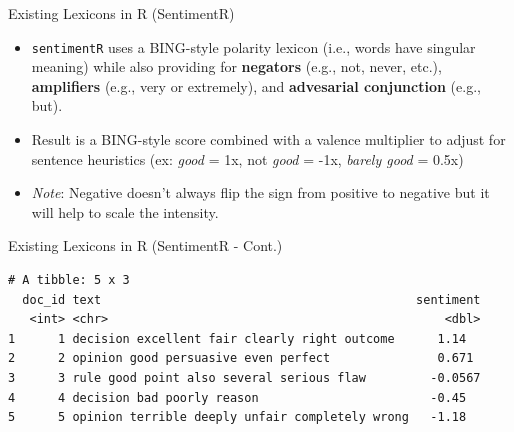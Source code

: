 \documentclass[
  ignorenonframetext,
  aspectratio=169]{beamer}
\newenvironment{Shaded}{\begin{snugshade}}{\end{snugshade}}
\newcommand{\AttributeTok}[1]{\textcolor[rgb]{0.13,0.29,0.53}{#1}}
\newcommand{\CommentTok}[1]{\textcolor[rgb]{0.56,0.35,0.01}{\textit{#1}}}
\newcommand{\FunctionTok}[1]{\textcolor[rgb]{0.13,0.29,0.53}{\textbf{#1}}}
\newcommand{\NormalTok}[1]{#1}
\newcommand{\SpecialCharTok}[1]{\textcolor[rgb]{0.81,0.36,0.00}{\textbf{#1}}}
\begin{document}
\begin{frame}{Existing Lexicons in R (SentimentR)}
\label{existing-lexicons-in-r-sentimentr}
\begin{itemize}
\item \texttt{sentimentR} uses a BING-style polarity lexicon (i.e., words have singular meaning) while also providing for \textbf{negators} (e.g., not, never, etc.), \textbf{amplifiers} (e.g., very or extremely), and \textbf{advesarial conjunction} (e.g., but). 
\item Result is a BING-style score combined with a valence multiplier to adjust for sentence heuristics (ex: \textit{good} = 1x, not \textit{good} = -1x, \textit{barely good} = 0.5x)
\item \textit{Note}: Negative doesn't always flip the sign from positive to negative but it will help to scale the intensity. 
\end{itemize}
\end{frame}

\begin{frame}[fragile]{Existing Lexicons in R (SentimentR - Cont.)}
\label{existing-lexicons-in-r-sentimentr---cont.}
\scriptsize

\begin{Shaded}
\end{Shaded}

\begin{verbatim}
# A tibble: 5 x 3
  doc_id text                                            sentiment
   <int> <chr>                                               <dbl>
1      1 decision excellent fair clearly right outcome      1.14  
2      2 opinion good persuasive even perfect               0.671 
3      3 rule good point also several serious flaw         -0.0567
4      4 decision bad poorly reason                        -0.45  
5      5 opinion terrible deeply unfair completely wrong   -1.18  
\end{verbatim}
\end{frame}
\end{document}
